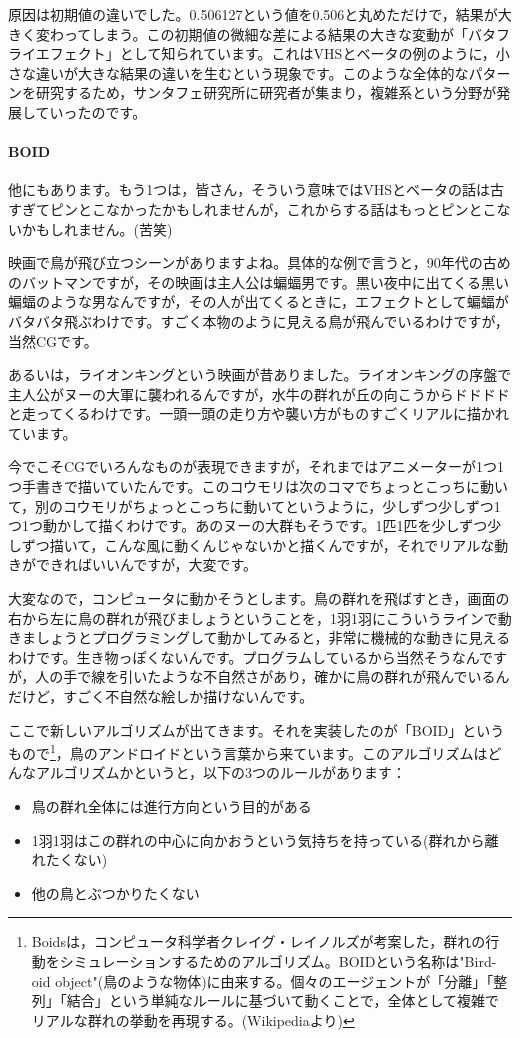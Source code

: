 \documentclass{ltjsbook}
\begin{document}
原因は初期値の違いでした。0.506127という値を0.506と丸めただけで，結果が大きく変わってしまう。この初期値の微細な差による結果の大きな変動が「バタフライエフェクト」として知られています。これはVHSとベータの例のように，小さな違いが大きな結果の違いを生むという現象です。このような全体的なパターンを研究するため，サンタフェ研究所に研究者が集まり，複雑系という分野が発展していったのです。

\paragraph{BOID}

他にもあります。もう1つは，皆さん，そういう意味ではVHSとベータの話は古すぎてピンとこなかったかもしれませんが，これからする話はもっとピンとこないかもしれません。(苦笑)

映画で鳥が飛び立つシーンがありますよね。具体的な例で言うと，90年代の古めのバットマンですが，その映画は主人公は蝙蝠男です。黒い夜中に出てくる黒い蝙蝠のような男なんですが，その人が出てくるときに，エフェクトとして蝙蝠がバタバタ飛ぶわけです。すごく本物のように見える鳥が飛んでいるわけですが，当然CGです。

あるいは，ライオンキングという映画が昔ありました。ライオンキングの序盤で主人公がヌーの大軍に襲われるんですが，水牛の群れが丘の向こうからドドドドと走ってくるわけです。一頭一頭の走り方や襲い方がものすごくリアルに描かれています。

今でこそCGでいろんなものが表現できますが，それまではアニメーターが1つ1つ手書きで描いていたんです。このコウモリは次のコマでちょっとこっちに動いて，別のコウモリがちょっとこっちに動いてというように，少しずつ少しずつ1つ1つ動かして描くわけです。あのヌーの大群もそうです。1匹1匹を少しずつ少しずつ描いて，こんな風に動くんじゃないかと描くんですが，それでリアルな動きができればいいんですが，大変です。

大変なので，コンピュータに動かそうとします。鳥の群れを飛ばすとき，画面の右から左に鳥の群れが飛びましょうということを，1羽1羽にこういうラインで動きましょうとプログラミングして動かしてみると，非常に機械的な動きに見えるわけです。生き物っぽくないんです。プログラムしているから当然そうなんですが，人の手で線を引いたような不自然さがあり，確かに鳥の群れが飛んでいるんだけど，すごく不自然な絵しか描けないんです。

ここで新しいアルゴリズムが出てきます。それを実装したのが「BOID」というもので\footnote{Boidsは，コンピュータ科学者クレイグ・レイノルズが考案した，群れの行動をシミュレーションするためのアルゴリズム。BOIDという名称は"Bird-oid object"(鳥のような物体)に由来する。個々のエージェントが「分離」「整列」「結合」という単純なルールに基づいて動くことで，全体として複雑でリアルな群れの挙動を再現する。(Wikipediaより)}，鳥のアンドロイドという言葉から来ています。このアルゴリズムはどんなアルゴリズムかというと，以下の3つのルールがあります：
\begin{itemize}
    \item 鳥の群れ全体には進行方向という目的がある
    \item 1羽1羽はこの群れの中心に向かおうという気持ちを持っている(群れから離れたくない)
    \item 他の鳥とぶつかりたくない
\end{itemize}
\end{document}

